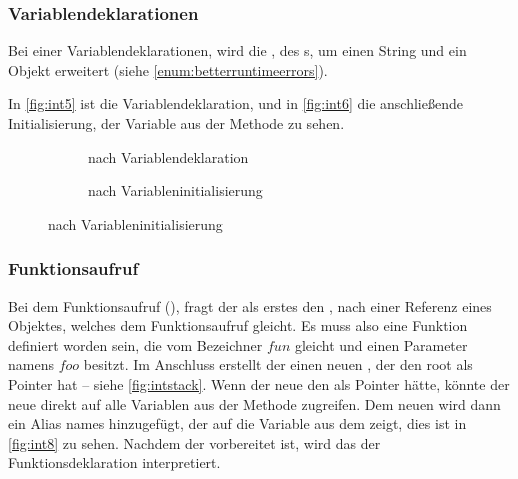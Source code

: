 {{    %
    \subsubsection{Variablendeklarationen}
    \label{sssec:Variablendeklarationen}
      Bei einer Variablendeklarationen, wird die , des s, um einen String und ein  Objekt erweitert (siehe \autoref{enum:betterruntimeerrors}).

      In \autoref{fig:int5} ist die Variablendeklaration, und in \autoref{fig:int6} die anschließende Initialisierung, der Variable aus der  Methode zu sehen.
      \begin{figure}[H]
        \centering
        \begin{minipage}{.45\linewidth}
          \begin{figure}[H]
            \centering
            \caption{ nach Variablendeklaration}
            \label{fig:int5}
          \end{figure}
        \end{minipage}%
        \begin{minipage}{.45\linewidth}
          \begin{figure}[H]
            \centering
            \caption{ nach Variableninitialisierung}
            \label{fig:int6}
          \end{figure}
        \end{minipage}
      \end{figure}

    \subsubsection{Funktionsaufruf}
    \label{sssec:Funktionsaufruf}
      Bei dem Funktionsaufruf (), fragt der  als erstes den , nach einer Referenz eines  Objektes, welches dem Funktionsaufruf gleicht. Es muss also eine Funktion definiert worden sein, die vom Bezeichner \myRIn$fun$ gleicht und einen Parameter namens \myRIn$foo$ besitzt. Im Anschluss erstellt der  einen neuen , der den root  als Pointer hat -- siehe \autoref{fig:intstack}. Wenn der neue  den   als Pointer hätte, könnte der neue  direkt auf alle Variablen aus der  Methode zugreifen. Dem neuen  wird dann ein Alias names  hinzugefügt, der auf die  Variable aus dem   zeigt, dies ist in \autoref{fig:int8} zu sehen. Nachdem der  vorbereitet ist, wird das  der Funktionsdeklaration interpretiert.

}}
